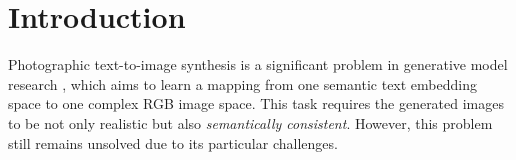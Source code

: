 \documentclass[10pt,twocolumn,letterpaper]{article}
\begin{document}
\section{Introduction}
Photographic text-to-image synthesis is a significant problem in generative model research \cite{reed2016generative}, which aims to learn a mapping from one semantic text embedding space to one complex RGB image space. This task requires the generated images to be not only realistic but also \textit{semantically consistent}.
However, this problem still remains unsolved due to its particular challenges. 

\end{document}
